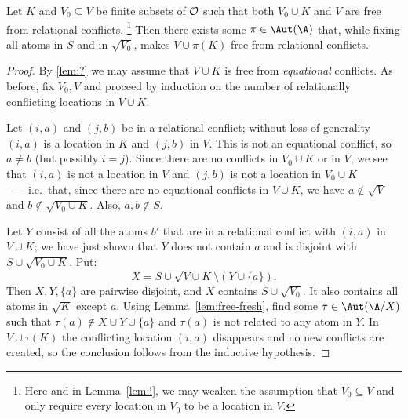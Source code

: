 \begin{lemma}\label{lem:!}
    Let $K$ and $V_0 \subseteq V$ be finite subsets of $\cal O$ such that both $V_0\cup K$ and $V$ are free from relational conflicts.%
    \footnote{Here and in Lemma~\ref{lem:!}, we may weaken the assumption that $V_0 \subseteq V$ and only require every location in $V_0$ to be a location in $V$.} 
    Then there exists some $\pi\in\Aut(\A)$ that, while fixing all atoms in $S$ and in $\sqrt{V_0}$, makes $V \cup \pi(K)$ free from relational conflicts.
\end{lemma}
\begin{proof}
    By \autoref{lem:?} we may assume that $V \cup K$ is free from {\em equational} conflicts. 
    As before, fix $V_0, V$ and proceed by induction on the number of relationally conflicting locations in $V \cup K$.
    
    Let $(i, a)$ and $(j, b)$ be in a relational conflict; 
    without loss of generality $(i, a)$ is a location in $K$ and $(j, b)$ in $V$. 
    This is not an equational conflict, so $a\neq b$ (but possibly $i=j$). 
    Since there are no conflicts in $V_0\cup K$ or in $V$, 
    we see that $(i, a)$ is not a location in $V$ and $(j, b)$ is not a location in $V_0 \cup K$~---~i.e.~that, 
    since there are no equational conflicts in $V \cup K$, we have $a\not\in \sqrt{V}$ and $b\not\in\sqrt{V_0\cup K}$.
    Also, $a,b\not\in S$.
    
    Let $Y$ consist of all the atoms $b'$ that are in a relational conflict with $(i,a)$ in $V\cup K$; 
    we have just shown that $Y$ does not contain $a$ and is disjoint with $S\cup\sqrt{V_0\cup K}$. 
    Put:
    \[
        X = S \cup \sqrt{V \cup K} \setminus (Y \cup \{a\}).
    \]
    Then $X, Y, \{a\}$ are pairwise disjoint, and $X$ contains $S \cup \sqrt{V_0}$. 
    It also contains all atoms in $\sqrt{K}$ except $a$.
    Using Lemma~\ref{lem:free-fresh}, find some $\tau\in \Aut(\A/X)$ such that $\tau(a) \not\in X \cup Y \cup \{a\}$ 
    and $\tau(a)$ is not related to any atom in $Y$. 
    In $V\cup\tau(K)$ the conflicting location $(i,a)$ disappears and no new conflicts are created, 
    so the conclusion follows from the inductive hypothesis.
\end{proof}

